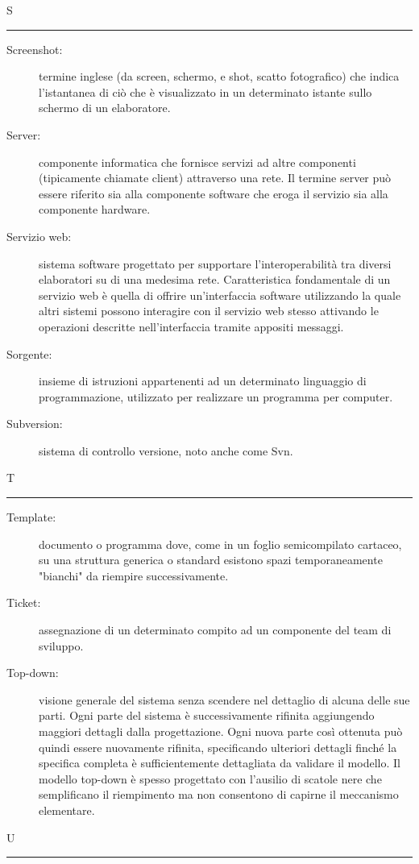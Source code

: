 \documentclass[11pt,a4paper]{article}
\begin{document}
\bigskip
\Huge S \bigskip
\hrule
\smallskip
\normalsize
\begin{description}
	\item[Screenshot:] termine inglese (da screen, schermo, e shot, scatto fotografico) che indica l'istantanea di ciò che è visualizzato in un determinato istante sullo schermo di un elaboratore.
	\item[Server:] componente informatica che fornisce servizi ad altre componenti (tipicamente chiamate client) attraverso una rete. Il termine server può essere riferito sia alla componente software che eroga il servizio sia alla componente hardware.
	\item[Servizio web:] sistema software progettato per supportare l'interoperabilità tra diversi elaboratori su di una medesima rete. Caratteristica fondamentale di un servizio web è quella di offrire un'interfaccia software utilizzando la quale altri sistemi possono interagire con il servizio web stesso attivando le operazioni descritte nell'interfaccia tramite appositi messaggi.
	\item[Sorgente:] insieme di istruzioni appartenenti ad un determinato linguaggio di programmazione, utilizzato per realizzare un programma per computer.
	\item[Subversion:] sistema di controllo versione, noto anche come Svn.
\end{description}
\bigskip
\Huge T \bigskip
\hrule
\smallskip
\normalsize
\begin{description}
	\item[Template:] documento o programma dove, come in un foglio semicompilato cartaceo, su una struttura generica o standard esistono spazi temporaneamente "bianchi" da riempire successivamente.
	\item[Ticket:] assegnazione di un determinato compito ad un componente del team di sviluppo.
	\item[Top-down:] visione generale del sistema senza scendere nel dettaglio di alcuna delle sue parti. Ogni parte del sistema è successivamente rifinita aggiungendo maggiori dettagli dalla progettazione. Ogni nuova parte così ottenuta può quindi essere nuovamente rifinita, specificando ulteriori dettagli finché la specifica completa è sufficientemente dettagliata da validare il modello. Il modello top-down è spesso progettato con l'ausilio di scatole nere che semplificano il riempimento ma non consentono di capirne il meccanismo elementare.
\end{description}
\bigskip
\Huge U \bigskip
\hrule
\smallskip
\end{document}

